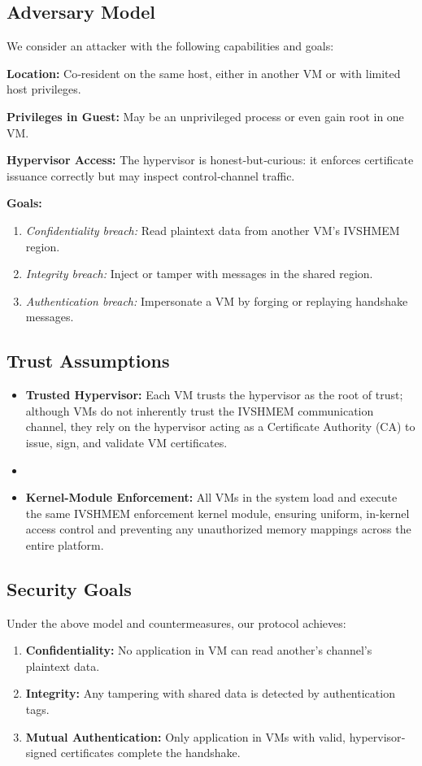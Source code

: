 \documentclass[conference]{IEEEtran}
\begin{document}
\subsection{Adversary Model}
We consider an attacker with the following capabilities and goals:
\begin{description}
  \item \textbf{Location:} Co‐resident on the same host, either in another VM or with limited
        host privileges.
  \item \textbf{Privileges in Guest:} May be an unprivileged process or even gain root in one
        VM.
  \item \textbf{Hypervisor Access:} The hypervisor is honest‐but‐curious: it enforces
        certificate issuance correctly but may inspect control‐channel traffic.
  \item \textbf{Goals:}
        \begin{enumerate}
          \item \emph{Confidentiality breach:} Read plaintext data from another VM’s IVSHMEM region.
          \item \emph{Integrity breach:} Inject or tamper with messages in the shared region.
          \item \emph{Authentication breach:} Impersonate a VM by forging or replaying handshake messages.
        \end{enumerate}
\end{description}

\subsection{Trust Assumptions}
\begin{itemize}
  \item \textbf{Trusted Hypervisor:} Each VM trusts the hypervisor as the root of trust; although VMs do not inherently trust the IVSHMEM communication channel, they rely on the hypervisor acting as a Certificate Authority (CA) to issue, sign, and validate VM certificates.
  \item
  \item \textbf{Kernel-Module Enforcement:} All VMs in the system load and execute the same IVSHMEM enforcement kernel module, ensuring uniform, in-kernel access control and preventing any unauthorized memory mappings across the entire platform.
\end{itemize}

\subsection{Security Goals}
Under the above model and countermeasures, our protocol achieves:
\begin{enumerate}
  \item \textbf{Confidentiality:} No application in VM can read another’s channel's plaintext data.
  \item \textbf{Integrity:} Any tampering with shared data is detected by authentication tags.
  \item \textbf{Mutual Authentication:} Only application in VMs with valid, hypervisor‐signed certificates complete the handshake.
\end{enumerate}
\end{document}
